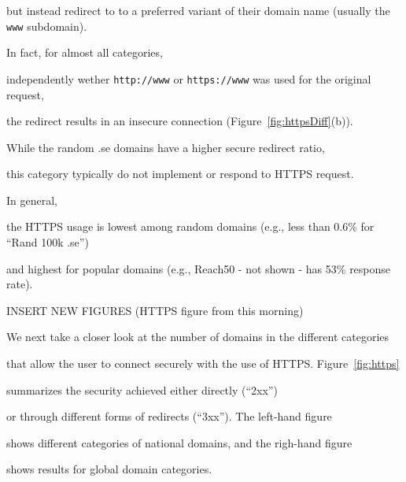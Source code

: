 \documentclass{sig-alternate-10pt}
\begin{document}
but instead redirect to to a preferred variant of their domain name (usually the \texttt{www} subdomain).

In fact, for almost all categories, 

independently wether \texttt{http://www} or \texttt{https://www} was used for the original request,

the redirect results in an insecure connection (Figure~\ref{fig:httpsDiff}(b)).

While the random .se domains have a higher secure redirect ratio,

this category typically do not implement or respond to HTTPS request. 


In general,

the HTTPS usage is lowest among random domains (e.g., less than 0.6\% for ``Rand 100k .se'')

and highest for popular domains (e.g., Reach50 - not shown - has 53\% response rate).











INSERT NEW FIGURES (HTTPS figure from this morning)



We next take a closer look at the number of domains in the different categories 

that allow the user to connect securely with the use of HTTPS.  Figure~\ref{fig:https} 

summarizes the security achieved either directly (``2xx'')

or through different forms of redirects (``3xx'').  The left-hand figure

shows different categories of national domains, and the righ-hand figure

shows results for global domain categories.
\end{document}
